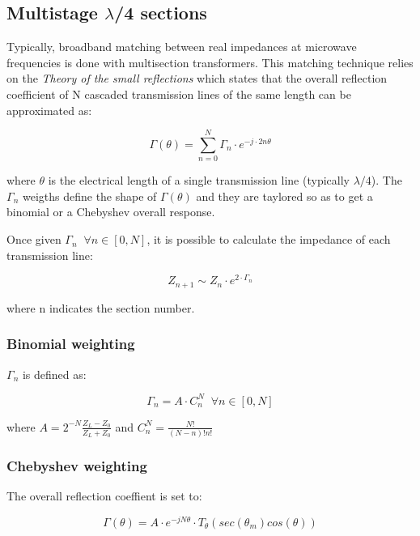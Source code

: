 \subsection{Multistage $\lambda$/4 sections}
Typically, broadband matching between real impedances at microwave frequencies is done with multisection transformers. This matching technique relies on the \textit{Theory of the small reflections} which states that the overall reflection coefficient of N cascaded transmission lines of the same length can be approximated as:

\begin{equation}
\Gamma(\theta) = \sum \limits_{n=0}^{N} \Gamma_n \cdot e^{-j\cdot 2n \theta}
\label{eq:CascadeReflection}
\end{equation}

\noindent where $\theta$ is the electrical length of a single transmission line (typically $\lambda/4$). The ${\Gamma_n}$ weigths define the shape of $\Gamma(\theta)$ and they are taylored so as to get a binomial or a Chebyshev overall response.

\noindent Once given $\Gamma_n \;\; \forall n \in [0, N]$, it is possible to calculate the impedance of each transmission line:

\begin{equation}
Z_{n+1} \sim Z_n \cdot e^{2\cdot\Gamma_n}
\end{equation}

\noindent where n indicates the section number.

\subsubsection{Binomial weighting}
\noindent $\Gamma_n$ is defined as:

\begin{equation}
\Gamma_n = A\cdot C^{N}_{n} \;\; \forall n \in [0, N]
\end{equation}

\noindent where $A = 2^{-N}\frac{Z_L - Z_0}{Z_L + Z_0}$ and $C^N_n = \frac{N!}{(N-n)!n!}$

\subsubsection{Chebyshev weighting}

\noindent The overall reflection coeffient is set to:

\begin{equation}
\Gamma(\theta) = A \cdot e^{-jN\theta} \cdot T_{\theta}(sec(\theta_m)cos(\theta))
\end{equation}

